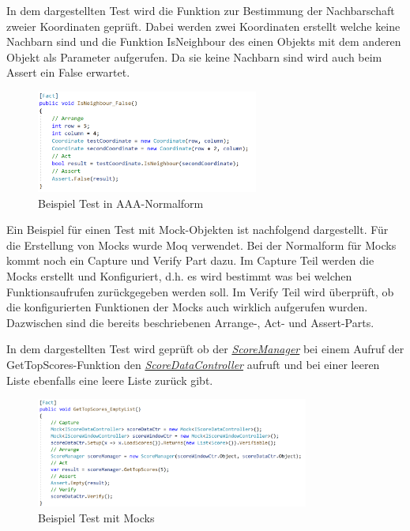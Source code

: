 In dem dargestellten Test wird die Funktion zur Bestimmung der Nachbarschaft zweier Koordinaten geprüft. Dabei werden zwei Koordinaten erstellt welche keine Nachbarn sind und die Funktion \glqq IsNeighbour\grqq{} des einen Objekts mit dem anderen Objekt als Parameter aufgerufen. Da sie keine Nachbarn sind wird auch beim Assert ein False erwartet.

\begin{figure}[!htb]
\centering
\includegraphics[width=0.65\textwidth]{Bilder/UnitTest2.PNG}
\caption{\label{Abb:UnitTest}Beispiel Test in AAA-Normalform}
\end{figure}

Ein Beispiel für einen Test mit Mock-Objekten ist nachfolgend dargestellt. Für die Erstellung von Mocks wurde Moq verwendet. Bei der Normalform für Mocks kommt noch ein \glqq Capture\grqq{}  und \glqq Verify\grqq{} Part dazu. Im Capture Teil werden die Mocks erstellt und Konfiguriert, d.h. es wird bestimmt was bei welchen Funktionsaufrufen zurückgegeben werden soll. Im Verify Teil wird überprüft, ob die konfigurierten Funktionen der Mocks auch wirklich aufgerufen wurden. Dazwischen sind die bereits beschriebenen Arrange-, Act- und Assert-Parts.

In dem dargestellten Test wird geprüft ob der \href{https://github.com/EinToni/Wortfinder/blob/main/Wortfinder/ScoreManager.cs}{\textit{ScoreManager}} bei einem Aufruf der \glqq GetTopScores\grqq{}-Funktion den \href{https://github.com/EinToni/Wortfinder/blob/main/Wortfinder/ScoreDataController.cs}{\textit{ScoreDataController}} aufruft und bei einer leeren Liste ebenfalls eine leere Liste zurück gibt.

\begin{figure}[!htb]
\centering
\includegraphics[width=0.8\textwidth]{Bilder/UnitTestVerify.PNG}
\caption{\label{Abb:UnitTestMocks}Beispiel Test mit Mocks}
\end{figure}

